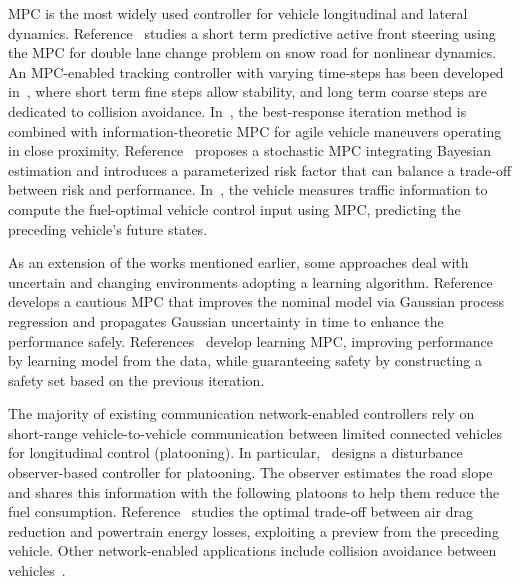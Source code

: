 \documentclass[letterpaper, 10 pt, conference]{ieeeconf}
\begin{document}
MPC is the most widely used controller for vehicle longitudinal and lateral dynamics.
Reference~\cite{falcone2007predictive} studies a short term predictive active front steering using the MPC for double lane change problem on snow road for nonlinear dynamics. An MPC-enabled tracking controller with varying time-steps has been developed in~\cite{funke2016collision}, where short term fine steps allow stability, and long term coarse steps are dedicated to collision avoidance. In~\cite{williams2018best}, the best-response iteration method is combined with information-theoretic MPC for agile vehicle maneuvers operating in close proximity. Reference~\cite{carvalho2014stochastic} proposes a stochastic MPC integrating Bayesian estimation and introduces a parameterized risk factor that can balance a trade-off between risk and performance.
In~\cite{kamal2012model}, the vehicle measures traffic information to compute the fuel-optimal vehicle control input using MPC, predicting the preceding vehicle's future states.

As an extension of the works mentioned earlier, some approaches deal with uncertain and changing environments adopting a learning algorithm. Reference~\cite{hewing2019cautious} develops a cautious MPC that improves the nominal model via Gaussian process regression and propagates Gaussian uncertainty in time to enhance the performance safely. References~\cite{rosolia2017learning,rosolia2017robust} develop learning MPC, improving performance by learning model from the data, while guaranteeing safety by constructing a safety set based on the previous iteration.

The majority of existing communication network-enabled controllers rely on short-range vehicle-to-vehicle communication between limited connected vehicles for longitudinal control (platooning). 
In particular,~\cite{na2020disturbance} designs a disturbance observer-based controller for platooning. The observer estimates the road slope and shares this information with the following platoons to help them  reduce the fuel consumption. Reference~\cite{bertoni2017adaptive} studies the optimal trade-off between air drag reduction and powertrain energy losses, exploiting a preview from the preceding vehicle. Other network-enabled applications include collision avoidance between vehicles~\cite{miller2002adaptive,biswas2006vehicle,hafner2013cooperative}.
\end{document}
